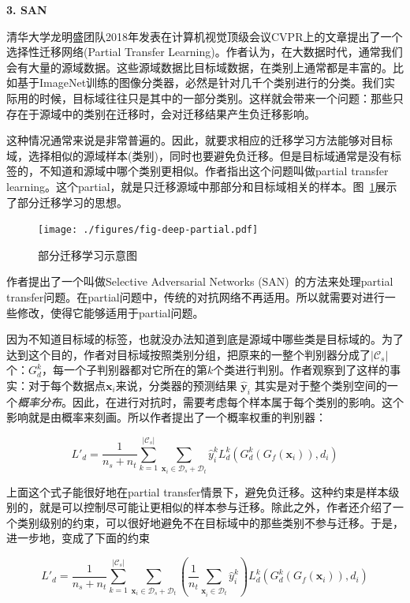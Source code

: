 \textbf{3. SAN}

清华大学龙明盛团队2018年发表在计算机视觉顶级会议CVPR上的文章提出了一个选择性迁移网络(Partial Transfer Learning)。作者认为，在大数据时代，通常我们会有大量的源域数据。这些源域数据比目标域数据，在类别上通常都是丰富的。比如基于ImageNet训练的图像分类器，必然是针对几千个类别进行的分类。我们实际用的时候，目标域往往只是其中的一部分类别。这样就会带来一个问题：那些只存在于源域中的类别在迁移时，会对迁移结果产生负迁移影响。

这种情况通常来说是非常普遍的。因此，就要求相应的迁移学习方法能够对目标域，选择相似的源域样本(类别)，同时也要避免负迁移。但是目标域通常是没有标签的，不知道和源域中哪个类别更相似。作者指出这个问题叫做partial transfer learning。这个partial，就是只迁移源域中那部分和目标域相关的样本。图~\ref{fig-deep-partial}展示了部分迁移学习的思想。

\begin{figure}[htbp]
	\centering
	\texttt{[image: ./figures/fig-deep-partial.pdf]}
	\caption{部分迁移学习示意图}
	\label{fig-deep-partial}
\end{figure}

作者提出了一个叫做Selective Adversarial Networks (SAN)~\cite{cao2017partial}的方法来处理partial transfer问题。在partial问题中，传统的对抗网络不再适用。所以就需要对进行一些修改，使得它能够适用于partial问题。

因为不知道目标域的标签，也就没办法知道到底是源域中哪些类是目标域的。为了达到这个目的，作者对目标域按照类别分组，把原来的一整个判别器分成了$|\mathcal{C}_s|$个：$G^k_d$，每一个子判别器都对它所在的第$k$个类进行判别。作者观察到了这样的事实：对于每个数据点$\mathbf{x}_i$来说，分类器的预测结果 $\hat{\mathbf{y}}_i$ 其实是对于整个类别空间的一个\textit{概率分布}。因此，在进行对抗时，需要考虑每个样本属于每个类别的影响。这个影响就是由概率来刻画。所以作者提出了一个概率权重的判别器：

\begin{equation}
	L'_d=\frac{1}{n_s+n_t} \sum_{k=1}^{|\mathcal{C}_s|} \sum_{\mathbf{x}_i \in \mathcal{D}_s + \mathcal{D}_t}^{} \hat{y}^k_i L^k_d(G^k_d(G_f(\mathbf{x}_i)),d_i)
\end{equation}

上面这个式子能很好地在partial transfer情景下，避免负迁移。这种约束是样本级别的，就是可以控制尽可能让更相似的样本参与迁移。除此之外，作者还介绍了一个类别级别的约束，可以很好地避免不在目标域中的那些类别不参与迁移。于是，进一步地，变成了下面的约束

\begin{equation}
	L'_d=\frac{1}{n_s+n_t} \sum_{k=1}^{|\mathcal{C}_s|} \sum_{\mathbf{x}_i \in \mathcal{D}_s + \mathcal{D}_t}^{} (\frac{1}{n_t} \sum_{\mathbf{x}_i^{} \in \mathcal{D}_t}\hat{y}^k_i) L^k_d(G^k_d(G_f(\mathbf{x}_i)),d_i)
\end{equation}

